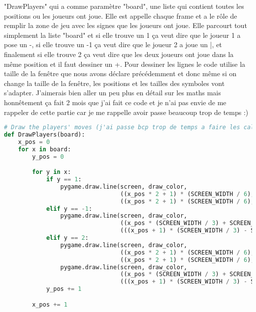 \documentclass[12pt]{article}
\begin{document}
"DrawPlayers" qui a comme paramètre "board", une liste qui contient toutes les positions ou les joueurs ont joue. Elle est appelle chaque frame et a le rôle de remplir la zone de jeu avec les signes que les joueurs ont joue. Elle parcourt tout simplement la liste "board" et si elle trouve un 1 ça veut dire que le joueur 1 a pose un -, si elle trouve un -1 ça veut dire que le joueur 2 a joue un |, et finalement si elle trouve 2 ça veut dire que les deux joueurs ont joue dans la même position et il faut dessiner un +. Pour dessiner les lignes le code utilise la taille de la fenêtre que nous avons déclare précédemment et donc même si on change la taille de la fenêtre, les positions et les tailles des symboles vont s'adapter. J'aimerais bien aller un peu plus en détail sur les maths mais honnêtement ça fait 2 mois que j'ai fait ce code et je n'ai pas envie de me rappeler de cette partie car je me rappelle avoir passe beaucoup trop de temps :)
\newpage
   \begin{lstlisting}[language=Python]
# Draw the players' moves (j'ai passe bcp trop de temps a faire les calcules j'en ai marre)
def DrawPlayers(board):
    x_pos = 0
    for x in board:
        y_pos = 0

        for y in x:
            if y == 1:
                pygame.draw.line(screen, draw_color,
                                 ((x_pos * 2 + 1) * (SCREEN_WIDTH / 6), (y_pos * (SCREEN_HEIGHT / 3)) + SCREEN_HEIGHT / 18),
                                 ((x_pos * 2 + 1) * (SCREEN_WIDTH / 6), ((y_pos + 1) * (SCREEN_HEIGHT / 3)) - SCREEN_HEIGHT / 18), LINE_WIDTH)
            elif y == -1:
                pygame.draw.line(screen, draw_color,
                                 ((x_pos * (SCREEN_WIDTH / 3) + SCREEN_WIDTH / 18), (y_pos * 2 + 1) * (SCREEN_HEIGHT / 6)),
                                 (((x_pos + 1) * (SCREEN_WIDTH / 3) - SCREEN_WIDTH / 18), (y_pos * 2 + 1) * (SCREEN_HEIGHT / 6)), LINE_WIDTH)
            elif y == 2:
                pygame.draw.line(screen, draw_color,
                                 ((x_pos * 2 + 1) * (SCREEN_WIDTH / 6), (y_pos * (SCREEN_HEIGHT / 3)) + SCREEN_HEIGHT / 18),
                                 ((x_pos * 2 + 1) * (SCREEN_WIDTH / 6), ((y_pos + 1) * (SCREEN_HEIGHT / 3)) - SCREEN_HEIGHT / 18), LINE_WIDTH)
                pygame.draw.line(screen, draw_color,
                                 ((x_pos * (SCREEN_WIDTH / 3) + SCREEN_WIDTH / 18), (y_pos * 2 + 1) * (SCREEN_HEIGHT / 6)),
                                 (((x_pos + 1) * (SCREEN_WIDTH / 3) - SCREEN_WIDTH / 18), (y_pos * 2 + 1) * (SCREEN_HEIGHT / 6)), LINE_WIDTH)
            y_pos += 1

        x_pos += 1 \end{lstlisting}
\end{document}
